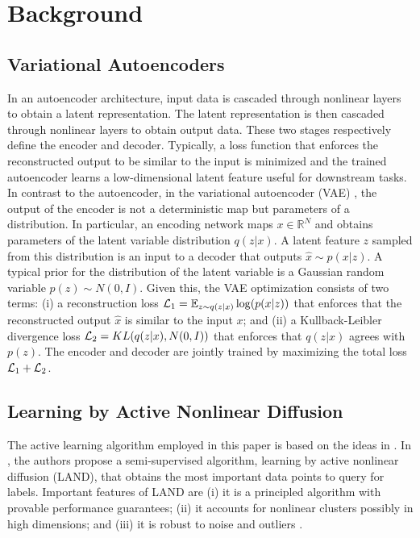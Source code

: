 \documentclass{article}
\def\R{\mathbb{R}}
\def\L{{\cal L}}
\def\L{{\cal L}}
\def\R{{\mathbb R}}
\def\E{{\mathbb E}}
\begin{document}

\section{Background}
\label{sec:vaes}


\subsection{Variational Autoencoders}
\label{subsec:vaes}


In an autoencoder architecture, input data is cascaded through nonlinear layers to obtain a latent representation. The latent representation is then cascaded  through nonlinear layers to obtain output data. These two stages respectively define the encoder and decoder. Typically, a loss function that enforces the reconstructed output to be similar to the input is minimized and the trained autoencoder learns
a low-dimensional latent feature useful for downstream tasks. In contrast to the autoencoder, in the variational autoencoder (VAE) \cite{kingma2014auto}, the output of the encoder is not a deterministic map but parameters of a distribution.  In particular, an encoding network maps $x \in \R^N$ and obtains parameters of the latent variable distribution $q(z|x)$. A latent feature $z$  sampled from this distribution is an input to a decoder that outputs $\hat{x}\sim p(x|z)$. A typical prior for the distribution of the latent variable is a Gaussian random variable $p(z)\sim N(0,I)$. Given this, the VAE optimization consists of two terms: (i) a reconstruction loss $\L_1=  \E_{z \sim q(z|x)} \log(p(x|z))$ that enforces that the reconstructed output $\hat{x}$ is similar to the input $x$; and (ii) a Kullback-Leibler divergence loss $\L_2 =  KL(q(z|x),N(0,I))$  that enforces that $q(z|x)$ agrees with $p(z)$. The encoder and decoder are jointly trained by maximizing the total loss $\L_1+\L_2$. 

\subsection{Learning by Active Nonlinear Diffusion}



The active learning algorithm employed in this paper is based on the ideas in \cite{Murphy2019_Unsupervised, Maggioni2019_LUND, Murphy2020_Spectral}.  In \cite{Maggioni2019_LAND}, the authors propose a semi-supervised algorithm, learning by active nonlinear diffusion (LAND), that obtains the most important data points to query  for labels.  Important features of LAND are (i) it is a principled algorithm with provable performance guarantees; (ii) it accounts for nonlinear clusters possibly in high dimensions; and (iii) it is robust to noise and outliers \cite{Maggioni2019_LAND}.
\end{document}

